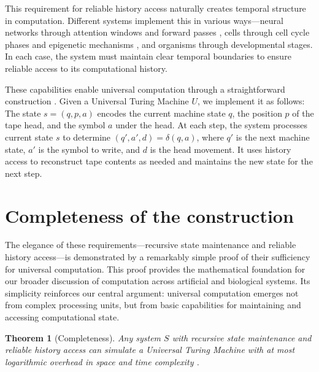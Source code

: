 \documentclass[12pt]{article}
\newtheorem{theorem}{Theorem}
\begin{document}
This requirement for reliable history access naturally creates temporal structure in computation.
Different systems implement this in various ways---neural networks through attention windows and forward passes \cite{martini2015information,quentin2019differential}, cells through cell cycle phases and epigenetic mechanisms \cite{bruno2022epigenetic}, and organisms through developmental stages.
In each case, the system must maintain clear temporal boundaries to ensure reliable access to its computational history.

These capabilities enable universal computation through a straightforward construction \cite{deutsch1995universality,bennett1989time}.
Given a Universal Turing Machine $U$, we implement it as follows: The state $s = (q, p, a)$ encodes the current machine state $q$, the position $p$ of the tape head, and the symbol $a$ under the head.
At each step, the system processes current state $s$ to determine $(q', a', d) = \delta(q, a)$, where $q'$ is the next machine state, $a'$ is the symbol to write, and $d$ is the head movement.
It uses history access to reconstruct tape contents as needed and maintains the new state for the next step.

\section{Completeness of the construction}

The elegance of these requirements---recursive state maintenance and reliable history access---is demonstrated by a remarkably simple proof of their sufficiency for universal computation.
This proof provides the mathematical foundation for our broader discussion of computation across artificial and biological systems.
Its simplicity reinforces our central argument: universal computation emerges not from complex processing units, but from basic capabilities for maintaining and accessing computational state.

\vspace{1em}

\begin{theorem}[Completeness]
Any system $S$ with recursive state maintenance and reliable history access can simulate a Universal Turing Machine with at most logarithmic overhead in space and time complexity \cite{boyle2024memory,liskiewicz1994complexity}.
\end{theorem}
\end{document}
